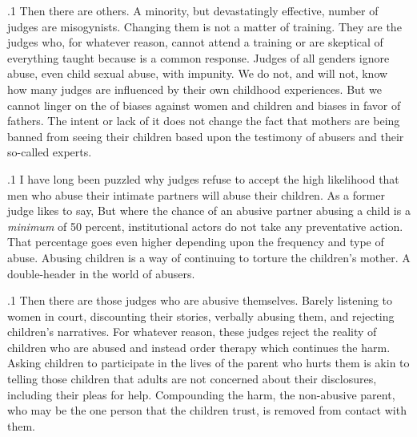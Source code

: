 \documentclass[11pt, twoside]{article}
\begin{document}
{\p.1{%
Then there are others. A minority, but devastatingly effective, number
of judges are misogynists. Changing them is not a matter of training.
They are the judges who, for whatever reason, cannot attend a training or
are skeptical of everything taught because   is a common response. Judges of all genders ignore abuse,
even child sexual abuse, with impunity. We do not, and will not, know
how many judges are influenced by their own childhood experiences.
But we cannot linger on the  of biases against women and children
and biases in favor of fathers. The intent or lack of it does not change
the fact that mothers are being banned from seeing their children based
upon the testimony of abusers and their so-called experts.
}%

\p.1{%
I have long been puzzled why judges refuse to accept the high likelihood that men who abuse their intimate partners will abuse their
children. As a former judge likes to say,  But
where the chance of an abusive partner abusing a child is a \textit{minimum} of
50 percent, institutional actors do not take any preventative action. That
percentage goes even higher depending upon the frequency and type of
abuse. Abusing children is a way of continuing to torture the children's
mother. A double-header in the world of abusers.
}%

\p.1{%
Then there are those judges who are abusive themselves. Barely listening to women in court, discounting their stories, verbally abusing
them, and rejecting children's narratives. For whatever reason, these
judges reject the reality of children who are abused and instead order
 therapy which continues the harm. Asking children to
participate in the lives of the parent who hurts them is akin to telling
those children that adults are not concerned about their disclosures, including their pleas for help. Compounding the harm, the non-abusive
parent, who may be the one person that the children trust, is removed
from contact with them.
}%

}
\end{document}
